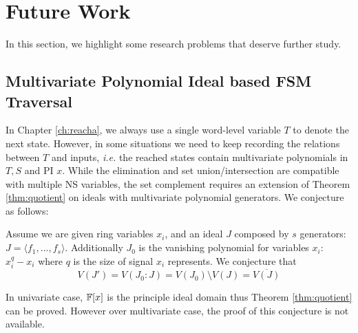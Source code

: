 \section{Future Work}
In this section, we highlight some research problems that deserve further study.
\subsection{Multivariate Polynomial Ideal based FSM Traversal}
In Chapter \ref{ch:reacha}, we always use a single word-level variable $T$ to denote the
next state. However, in some situations we need to keep recording the relations between $T$ and
inputs, {\it i.e.} the reached states contain multivariate polynomials in $T,S$ and PI $x$. 
While the elimination and set union/intersection are compatible with multiple NS variables,
the set complement requires an extension of Theorem \ref{thm:quotient} on ideals with 
multivariate polynomial generators. We conjecture as follows:

\begin{Conjecture}
Assume we are given ring variables $x_i$, and an ideal $J$ composed by $s$ generators:
$J = \langle f_1,\dots, f_s\rangle$.  Additionally $J_0$ is the vanishing polynomial for variables
$x_i$: $ x_i^{q} - x_i$ where $q$ is the size of signal $x_i$ represents.
We conjecture that
$$V(J') = V(J_0:J) = V(J_0)\setminus V(J) = \overline{V(J)}$$
\end{Conjecture}

In univariate case, ${\mathbb{F}}[x]$ is the principle ideal domain thus Theorem \ref{thm:quotient} can be proved.
However over multivariate case, the proof of this conjecture is not available.

